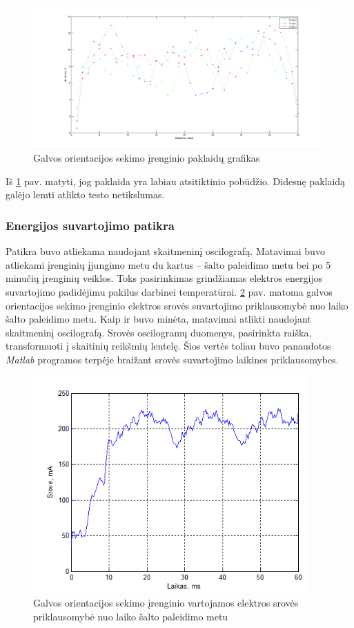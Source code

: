 \documentclass[]{vgtuef}
\begin{document}
{\begin{figure}[htbp]
  \centering
  \includegraphics[width=450px]{img/kampai.png}
  \caption{Galvos orientacijos sekimo įrenginio paklaidų grafikas}
  \label{fig:headtracker_test3}
\end{figure}

Iš \ref{fig:headtracker_test3} pav. matyti, jog paklaida yra labiau atsitiktinio pobūdžio. Didesnę paklaidą galėjo lemti atlikto testo netikslumas.

\subsubsection{Energijos suvartojimo patikra}

Patikra buvo atliekama naudojant skaitmeninį oscilografą. Matavimai buvo atliekami įrenginių įjungimo metu du kartus -- šalto paleidimo metu bei po 5 minučių įrenginių veiklos. Toks pasirinkimas grindžiamas elektros energijos suvartojimo padidėjimu pakilus darbinei temperatūrai. \ref{fig:headtracker_coldboot} pav. matoma galvos orientacijos sekimo įrenginio elektros srovės suvartojimo priklausomybė nuo laiko šalto paleidimo metu. Kaip ir buvo minėta, matavimai atlikti naudojant skaitmeninį oscilografą. Srovės oscilogramų duomenys, pasirinkta raiška, transformuoti į skaitinių reikšmių lentelę. Šios vertės toliau buvo panaudotos \textit{Matlab} programos terpėje braižant srovės suvartojimo laikines priklausomybes.

\begin{figure}[htbp]
  \centering
  \includegraphics[width=400px]{img/head_tracker_coldboot.png}
  \caption{Galvos orientacijos sekimo įrenginio vartojamos elektros srovės priklausomybė nuo laiko šalto paleidimo metu}
  \label{fig:headtracker_coldboot}
\end{figure}

}
\end{document}
